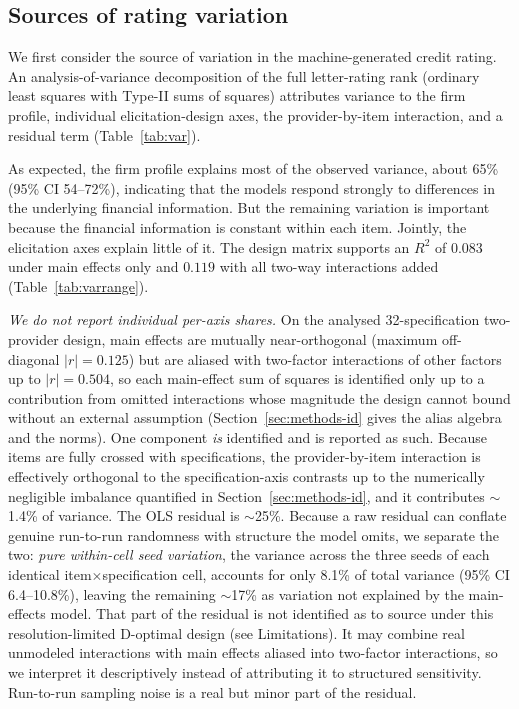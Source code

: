 \documentclass[a4paper,fleqn]{cas-sc}
\begin{document}
\subsection{Sources of rating variation}
We first consider the source of variation in the machine-generated credit rating. An
analysis-of-variance decomposition of the full letter-rating rank (ordinary least squares with Type-II
sums of squares) attributes variance to the firm profile, individual elicitation-design axes, the
provider-by-item interaction, and a residual term (Table~\ref{tab:var}).

As expected, the firm profile explains most of the observed variance, about 65\% (95\% CI 54--72\%),
indicating that the models respond strongly to differences in the underlying financial information. But
the remaining variation is important because the financial information is constant within each item. Jointly, the elicitation axes explain little of it. The design matrix supports an $R^2$ of $0.083$ under main effects only and $0.119$ with
all two-way interactions added (Table~\ref{tab:varrange}).

\emph{We do not report individual per-axis shares.} On the analysed 32-specification two-provider design, main effects are
mutually near-orthogonal (maximum off-diagonal $|r|=0.125$) but are aliased with two-factor
interactions of other factors up to $|r|=0.504$, so each main-effect sum of
squares is identified only up to a contribution from omitted interactions whose magnitude the design
cannot bound without an external assumption (Section~\ref{sec:methods-id} gives the alias algebra and the norms). One component \emph{is} identified and is reported as
such. Because items are fully crossed with specifications, the provider-by-item interaction is
effectively orthogonal to the specification-axis contrasts up to the numerically negligible imbalance quantified in Section~\ref{sec:methods-id}, and it contributes $\sim$1.4\% of variance. The OLS residual
is $\sim$25\%. Because a raw residual can conflate genuine run-to-run randomness with structure the model
omits, we separate the two: \emph{pure within-cell seed variation}, the variance across the three seeds
of each identical item$\times$specification cell, accounts for only 8.1\% of total variance (95\% CI
6.4--10.8\%), leaving the remaining $\sim$17\% as variation not explained by the main-effects model.
That part of the residual is not identified as to source under this resolution-limited D-optimal design
(see Limitations). It may combine real unmodeled interactions with main effects aliased into two-factor
interactions, so we interpret it descriptively instead of attributing it to structured sensitivity.
Run-to-run sampling noise is a real but minor part of the residual.
\end{document}
